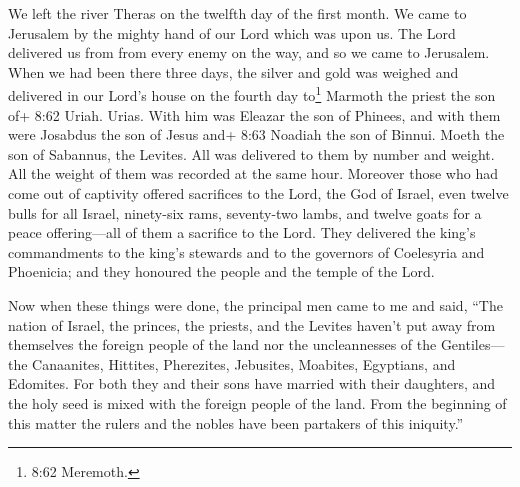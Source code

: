  We left the river Theras on the twelfth day of the first
month. We came to Jerusalem by the mighty hand of our Lord which was
upon us. The Lord delivered us from from every enemy on the way, and so
we came to Jerusalem.  When we had been there three days,
the silver and gold was weighed and delivered in our Lord's house on the
fourth day to\footnote{8:62 Meremoth.} Marmoth the priest the son of+
8:62 Uriah. Urias.  With him was Eleazar the son of
Phinees, and with them were Josabdus the son of Jesus and+ 8:63 Noadiah
the son of Binnui. Moeth the son of Sabannus, the Levites. All was
delivered to them by number and weight.  All the weight of
them was recorded at the same hour.  Moreover those who had
come out of captivity offered sacrifices to the Lord, the God of Israel,
even twelve bulls for all Israel, ninety-six rams, 
seventy-two lambs, and twelve goats for a peace offering---all of them a
sacrifice to the Lord.  They delivered the king's
commandments to the king's stewards and to the governors of Coelesyria
and Phoenicia; and they honoured the people and the temple of the Lord.

 Now when these things were done, the principal men came to
me and said,  ``The nation of Israel, the princes, the
priests, and the Levites haven't put away from themselves the foreign
people of the land nor the uncleannesses of the Gentiles---the
Canaanites, Hittites, Pherezites, Jebusites, Moabites, Egyptians, and
Edomites.  For both they and their sons have married with
their daughters, and the holy seed is mixed with the foreign people of
the land. From the beginning of this matter the rulers and the nobles
have been partakers of this iniquity.''

